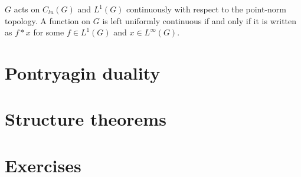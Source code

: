 \documentclass{../../large}
\begin{document}
\begin{prb}
$G$ acts on $C_{lu}(G)$ and $L^1(G)$ continuously with respect to the point-norm topology.
A function on $G$ is left uniformly continuous if and only if it is written as $f*x$ for some $f\in L^1(G)$ and $x\in L^\infty(G)$.
\end{prb}



\section{Pontryagin duality}

\begin{prb}
\end{prb}
\begin{prb}
\end{prb}
\begin{prb}
\end{prb}


\section{Structure theorems}

\section*{Exercises}
\begin{prb}
\end{prb}
\end{document}
